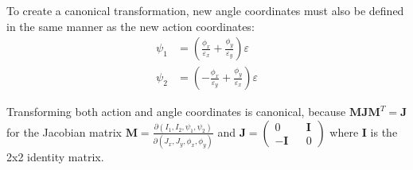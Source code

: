 To create a canonical transformation, new angle coordinates must also be defined in the same manner as the new action coordinates:
\begin{align}
	\psi_1 & = \left( \frac{\phi_x}{\varepsilon_x} + \frac{\phi_y}{\varepsilon_y} \right) \varepsilon  \\
	\psi_2 & = \left( -\frac{\phi_x}{\varepsilon_y} + \frac{\phi_y}{\varepsilon_x} \right) \varepsilon
\end{align}

Transforming both action and angle coordinates is canonical, because $\mathbf{M}\mathbf{J}\mathbf{M}^T = \mathbf{J}$ for the Jacobian matrix $\mathbf{M} = \frac{\partial(I_1,I_2,\psi_1,\psi_2)}{\partial(J_x,J_y,\phi_x,\phi_y)}$ and $\mathbf{J} = (\begin{smallmatrix} 0 && \mathbf{I} \\ -\mathbf{I} && 0 \end{smallmatrix})$ where $\mathbf{I}$ is the 2x2 identity matrix.

